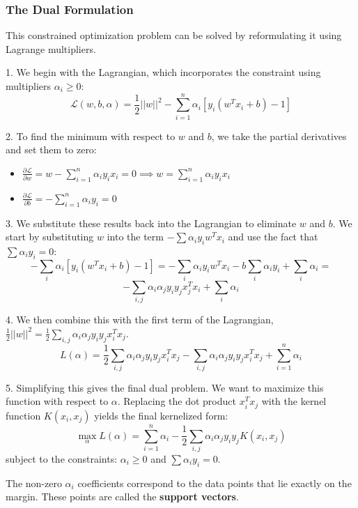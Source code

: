 \documentclass{article}
\begin{document}
\begin{multicols}{2}
\subsubsection{The Dual Formulation}
This constrained optimization problem can be solved by reformulating it using Lagrange multipliers.

1.  We begin with the Lagrangian, which incorporates the constraint using multipliers $\alpha_i \ge 0$:
    $$\mathcal{L}(w, b, \alpha) = \frac{1}{2}||w||^{2} - \sum_{i=1}^{n}\alpha_{i}[y_{i}(w^{T}x_{i} + b) - 1]$$

2.  To find the minimum with respect to $w$ and $b$, we take the partial derivatives and set them to zero:
    \begin{itemize}
        \item $\frac{\partial \mathcal{L}}{\partial w} = w - \sum_{i=1}^{n}\alpha_{i}y_{i}x_{i} = 0 \implies w = \sum_{i=1}^{n}\alpha_{i}y_{i}x_{i}$ 
        \item $\frac{\partial \mathcal{L}}{\partial b} = -\sum_{i=1}^{n}\alpha_{i}y_{i} = 0$ 
    \end{itemize}

3.  We substitute these results back into the Lagrangian to eliminate $w$ and $b$. We start by substituting $w$ into the term $-\sum \alpha_i y_i w^T x_i$ and use the fact that $\sum \alpha_i y_i = 0$:
    $$-\sum_{i}\alpha_{i}[y_{i}(w^{T}x_{i} + b) - 1] = -\sum_{i}\alpha_{i}y_{i}w^{T}x_{i} - b\sum_{i}\alpha_{i}y_{i} + \sum_{i}\alpha_{i} =$$
    $$-\sum_{i,j} \alpha_{i}\alpha_{j}y_{i}y_{j}x_{j}^T x_i + \sum_{i}\alpha_{i}$$
   

4.  We then combine this with the first term of the Lagrangian, $\frac{1}{2}||w||^2 = \frac{1}{2} \sum_{i,j} \alpha_{i}\alpha_{j}y_{i}y_{j}x_{i}^T x_{j}$.
    $$L(\alpha) = \frac{1}{2} \sum_{i,j} \alpha_{i}\alpha_{j}y_{i}y_{j}x_{i}^T x_{j} - \sum_{i,j} \alpha_{i}\alpha_{j}y_{i}y_{j}x_{i}^T x_{j} + \sum_{i=1}^{n} \alpha_i$$
   

5.  Simplifying this gives the final dual problem. We want to maximize this function with respect to $\alpha$. Replacing the dot product $x_i^T x_j$ with the kernel function $K(x_i, x_j)$ yields the final kernelized form:
    $$\max_{\alpha} L(\alpha) = \sum_{i=1}^{n} \alpha_i - \frac{1}{2} \sum_{i,j} \alpha_i \alpha_j y_i y_j K(x_i, x_j)$$
    subject to the constraints: $\alpha_i \ge 0$ and $\sum \alpha_i y_i = 0$.

The non-zero $\alpha_i$ coefficients correspond to the data points that lie exactly on the margin. These points are called the \textbf{support vectors}.


\end{multicols}
\end{document}
